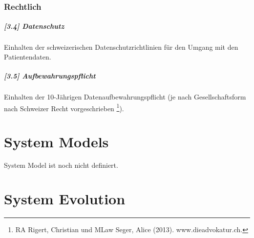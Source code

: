 \documentclass[a4paper]{scrreprt}
\begin{document}
\subsection{Rechtlich}
\paragraph{[3.4] Datenschutz} Einhalten der schweizerischen Datenschutzrichtlinien für den Umgang mit den Patientendaten.

\paragraph{[3.5] Aufbewahrungspflicht} Einhalten der 10-Jährigen Datenaufbewahrungspflicht (je nach Gesellschaftsform nach Schweizer Recht vorgeschrieben \footnote{RA Rigert, Christian und MLaw Seger, Alice (2013). www.dieadvokatur.ch.}).




\chapter{System Models}


System Model ist noch nicht definiert.


\chapter{System Evolution}
\end{document}

